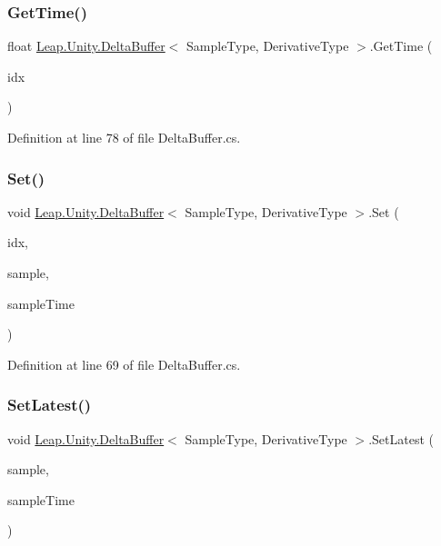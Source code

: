 \subsubsection{\texorpdfstring{GetTime()}{GetTime()}}
{\footnotesize\ttfamily float \mbox{\hyperlink{class_leap_1_1_unity_1_1_delta_buffer}{Leap.\+Unity.\+Delta\+Buffer}}$<$ Sample\+Type, Derivative\+Type $>$.Get\+Time (\begin{DoxyParamCaption}\item[{int}]{idx }\end{DoxyParamCaption})}



Definition at line 78 of file Delta\+Buffer.\+cs.

\mbox{\label{class_leap_1_1_unity_1_1_delta_buffer_ad3b9a4e7f743f8991b591d1ffd7db1c5}} 
\subsubsection{\texorpdfstring{Set()}{Set()}}
{\footnotesize\ttfamily void \mbox{\hyperlink{class_leap_1_1_unity_1_1_delta_buffer}{Leap.\+Unity.\+Delta\+Buffer}}$<$ Sample\+Type, Derivative\+Type $>$.Set (\begin{DoxyParamCaption}\item[{int}]{idx,  }\item[{Sample\+Type}]{sample,  }\item[{float}]{sample\+Time }\end{DoxyParamCaption})}



Definition at line 69 of file Delta\+Buffer.\+cs.

\mbox{\label{class_leap_1_1_unity_1_1_delta_buffer_abbd066336bcc8b7b937df00061ded48a}} 
\subsubsection{\texorpdfstring{SetLatest()}{SetLatest()}}
{\footnotesize\ttfamily void \mbox{\hyperlink{class_leap_1_1_unity_1_1_delta_buffer}{Leap.\+Unity.\+Delta\+Buffer}}$<$ Sample\+Type, Derivative\+Type $>$.Set\+Latest (\begin{DoxyParamCaption}\item[{Sample\+Type}]{sample,  }\item[{float}]{sample\+Time }\end{DoxyParamCaption})}



